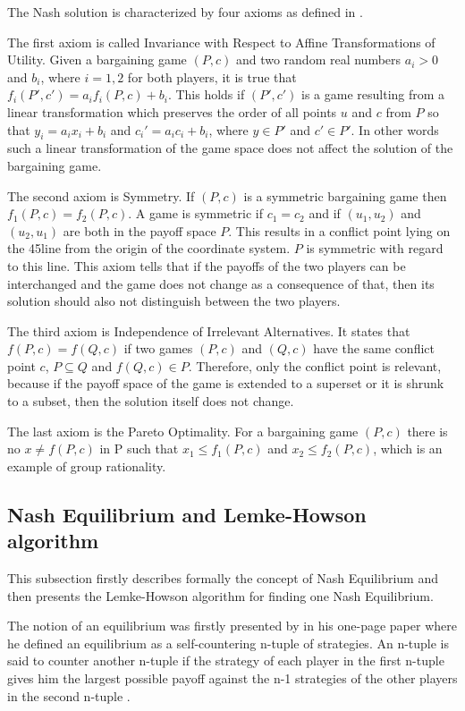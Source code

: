 The Nash solution is characterized by four axioms as defined in \citet{holler2006einfuhrung}. 

The first axiom is called Invariance with Respect to Affine Transformations of Utility. Given a bargaining game $(P,c)$ and two random real numbers $a_i > 0$ and $b_i$, where $i = 1,2$ for both players, it is true that $f_i(P',c') = a_i f_i(P,c) + b_i$. This holds if $(P',c')$ is a game resulting from a linear transformation which preserves the order of all points $u$ and $c$ from $P$ so that $y_i = a_i x_i + b_i$ and $c_i' = a_i c_i + b_i$, where $y \in P'$ and $c' \in P'$. In other words such a linear transformation of the game space does not affect the solution of the bargaining game.

The second axiom is Symmetry. If $(P,c)$ is a symmetric bargaining game then $f_1(P,c) = f_2(P,c)$. A game is symmetric if $c_1 = c_2$ and if $(u_1, u_2)$ and $(u_2, u_1)$ are both in the payoff space $P$. This results in a conflict point lying on the 45\textdegree  line from the origin of the coordinate system. $P$ is symmetric with regard to this line. This axiom tells that if the payoffs of the two players can be interchanged and the game does not change as a consequence of that, then its solution should also not distinguish between the two players.

The third axiom is Independence of Irrelevant Alternatives. It states that $f(P,c) = f(Q,c)$ if two games $(P,c)$ and $(Q,c)$ have the same conflict point $c$, $P \subseteq Q$ and $f(Q,c) \in P$. Therefore, only the conflict point is relevant, because if the payoff space of the game is extended to a superset or it is shrunk to a subset, then the solution itself does not change.

The last axiom is the Pareto Optimality. For a bargaining game $(P,c)$ there is no $x \neq f(P,c)$ in P such that $x_1 \leq f_1(P,c)$ and $x_2 \leq f_2(P,c)$, which is an example of group rationality.

\subsection{Nash Equilibrium and Lemke-Howson algorithm}
This subsection firstly describes formally the concept of Nash Equilibrium and then presents the Lemke-Howson algorithm for finding one Nash Equilibrium.

The notion of an equilibrium was firstly presented by \citet{nash1950equilibrium} in his one-page paper where he defined an equilibrium as a self-countering n-tuple of strategies. An n-tuple is said to counter another n-tuple if the strategy of each player in the first n-tuple gives him the largest possible payoff against the n-1 strategies of the other players in the second n-tuple \citep{nash1950equilibrium}. 

